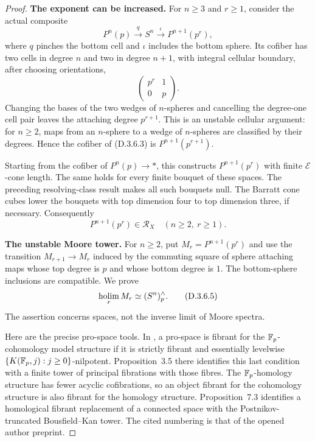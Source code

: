 \begin{proof}
\medskip\noindent
\textbf{The exponent can be increased.}
For $n\geq3$ and $r\geq1$, consider the actual composite
\[
 P^n(p)\xrightarrow{q}S^n
       \xrightarrow{\iota}P^{n+1}(p^r),
 \tag{D.3.6.3}
\]
where $q$ pinches the bottom cell and $\iota$ includes the
bottom sphere. Its cofiber has two cells in degree $n$ and
two in degree $n+1$, with integral cellular boundary, after
choosing orientations,
\[
                    \begin{pmatrix}p^r&1\\0&p\end{pmatrix}.
\]
Changing the bases of the two wedges of $n$-spheres and
cancelling the degree-one cell pair leaves the attaching
degree $p^{r+1}$. This is an unstable cellular argument:
for $n\geq2$, maps from an $n$-sphere to a wedge of
$n$-spheres are classified by their degrees. Hence the
cofiber of (D.3.6.3) is $P^{n+1}(p^{r+1})$.

Starting from the cofiber of $P^n(p)\to *$, this constructs
$P^{n+1}(p^r)$ with finite $\mathcal E$-cone length.
The same holds for every finite bouquet of these spaces.
The preceding resolving-class result makes all such bouquets
null. The Barratt cone cubes lower the bouquets with top
dimension four to top dimension three, if necessary.
Consequently
\[
               P^{n+1}(p^r)\in\mathcal R_X
                         \quad(n\geq2,\ r\geq1).
 \tag{D.3.6.4}
\]

\medskip\noindent
\textbf{The unstable Moore tower.}
For $n\geq2$, put $M_r=P^{n+1}(p^r)$ and use the transition
$M_{r+1}\to M_r$ induced by the commuting square of sphere
attaching maps whose top degree is $p$ and whose bottom
degree is $1$. The bottom-sphere inclusions are compatible.
We prove
\[
                   \operatorname*{holim}_r M_r\simeq(S^n)^{\wedge}_p.
 \tag{D.3.6.5}
\]
The assertion concerns spaces, not the inverse limit of
Moore spectra.

Here are the precise pro-space tools. In
\cite[Theorems~3.3, 6.3, 6.7 and~7.2; Proposition~7.3]
{I_Isaksen2005}, a pro-space is fibrant for the
$\mathbb F_p$-cohomology model structure if it is strictly fibrant
and essentially levelwise
$\{K(\mathbb F_p,j):j\geq0\}$-nilpotent. Proposition~3.5 there
identifies this last condition with a finite tower of
principal fibrations with those fibres. The
$\mathbb F_p$-homology structure has fewer acyclic cofibrations,
so an object fibrant for the cohomology structure is
also fibrant for the homology structure. Proposition~7.3
identifies a homological fibrant replacement of a connected
space with the Postnikov-truncated Bousfield--Kan tower.
The cited numbering is that of the opened author preprint.


\end{proof}
